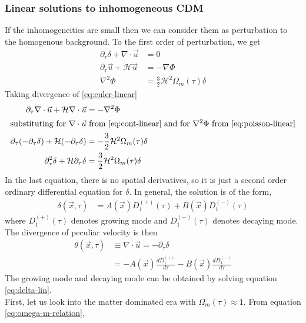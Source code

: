 \documentclass[12pt,twocolumn]{article}
\begin{document}
\subsubsection{Linear solutions to inhomogeneous CDM}
If the inhomogeneities are small then we can consider them as perturbation to the homogenous background. To the first order of perturbation, we get
\begin{align}
\label{eq:cont-linear}
\partial_{\tau} \delta + \nabla \cdot \vec{u} &= 0\\
\label{eq:euler-linear}
\partial_{\tau} \vec{u} + \mathcal{H} \vec{u} &= - \nabla \Phi\\
\label{eq:poisson-linear}
\nabla^2 \Phi &= \frac{3}{2} \mathcal{H}^2 \Omega_{m}(\tau) \delta
\end{align}
Taking divergence of \eqref{eq:euler-linear}
\begin{align}
\partial_{\tau} \nabla \cdot  \vec{u} + \mathcal{H} \nabla \cdot  \vec{u} &= - \nabla^2 \Phi \\
\intertext{substituting for $\nabla \cdot \vec{u}$ from \eqref{eq:cont-linear} and for $\nabla^2 \Phi$ from \eqref{eq:poisson-linear}}
\partial_{\tau} (-\partial_{\tau} \delta) + \mathcal{H} (-\partial_{\tau} \delta) &= - \frac{3}{2} \mathcal{H}^2 \Omega_{m}(\tau) \delta\\
\partial_{\tau}^2 \delta + \mathcal{H} \partial_{\tau} \delta &= \frac{3}{2} \mathcal{H}^2 \Omega_{m}(\tau) \delta \label{eq:delta-lin}
\end{align}
In the last equation, there is no spatial derivatives, so it is just a second order ordinary differential equation for $\delta$. In general, the solution is of the form,
\begin{align}
\delta (\vec{x}, \tau) &= A(\vec{x}) D_1^{(+)}(\tau) + B(\vec{x}) D_1^{(-)}(\tau) 
\end{align}
where $D_1^{(+)}(\tau)$ denotes growing mode and $D_1^{(-)}(\tau)$ denotes decaying mode. 
The divergence of peculiar velocity is then
\begin{align}
\theta  (\vec{x}, \tau) &\equiv \nabla \cdot  \vec{u} = -\partial_{\tau} \delta\\
&= - A(\vec{x}) \frac{d D_1^{(+)}}{d \tau} - B(\vec{x}) \frac{d D_1^{(-)}}{d \tau} 
\end{align}
The growing mode and decaying mode can be obtained by solving equation \eqref{eq:delta-lin}. \\
First, let us look into the matter dominated era with
$\Omega_{m}(\tau) \approx 1$. From equation \eqref{eq:omega-m-relation},
\end{document}
